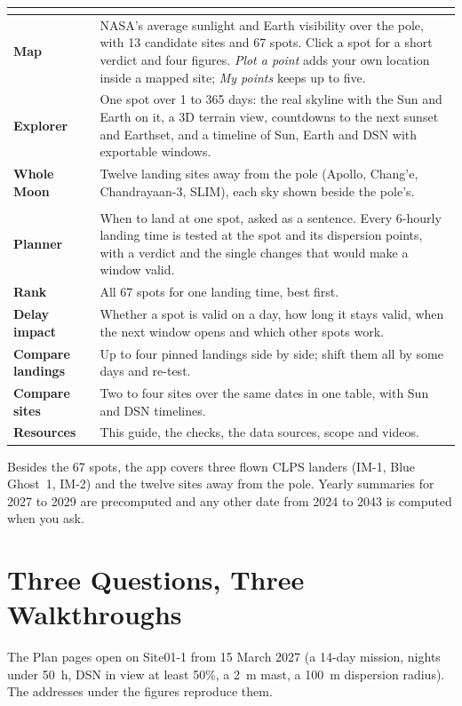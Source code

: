 \begin{lztable}
\begin{tabularx}{\textwidth}{@{}>{\bfseries}P{2.4cm}L@{}}
\toprule
{} \\
\midrule
Map & NASA's average sunlight and Earth visibility over the pole, with 13 candidate sites and 67 spots. Click a spot for a short verdict and four figures. \emph{Plot a point} adds your own location inside a mapped site; \emph{My points} keeps up to five. \\
Explorer & One spot over 1 to 365 days: the real skyline with the Sun and Earth on it, a 3D terrain view, countdowns to the next sunset and Earthset, and a timeline of Sun, Earth and DSN with exportable windows. \\
Whole Moon & Twelve landing sites away from the pole (Apollo, Chang'e, Chandrayaan-3, SLIM), each sky shown beside the pole's. \\
\midrule
{} \\
\midrule
Planner & When to land at one spot, asked as a sentence. Every 6-hourly landing time is tested at the spot and its dispersion points, with a verdict and the single changes that would make a window valid. \\
Rank & All 67 spots for one landing time, best first. \\
Delay impact & Whether a spot is valid on a day, how long it stays valid, when the next window opens and which other spots work. \\
Compare landings & Up to four pinned landings side by side; shift them all by some days and re-test. \\
Compare sites & Two to four sites over the same dates in one table, with Sun and DSN timelines. \\
\midrule
Resources & This guide, the checks, the data sources, scope and videos. \\
\bottomrule
\end{tabularx}
\end{lztable}

Besides the 67 spots, the app covers three flown CLPS landers (IM-1, Blue Ghost~1, IM-2) and the twelve sites away from the pole. Yearly summaries for 2027 to 2029 are precomputed and any other date from 2024 to 2043 is computed when you ask.

\section{Three Questions, Three Walkthroughs}\label{sec:walkthroughs}
The Plan pages open on Site01-1 from 15 March 2027 (a 14-day mission, nights under 50~h, DSN in view at least 50\%, a 2~m mast, a 100~m dispersion radius). The addresses under the figures reproduce them.


